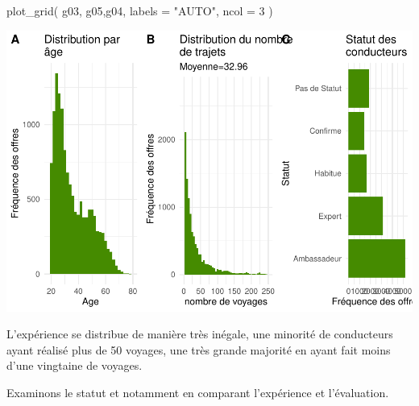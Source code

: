 \documentclass[
]{book}
\newenvironment{Shaded}{\begin{snugshade}}{\end{snugshade}}
\newcommand{\AttributeTok}[1]{\textcolor[rgb]{0.77,0.63,0.00}{#1}}
\newcommand{\DecValTok}[1]{\textcolor[rgb]{0.00,0.00,0.81}{#1}}
\newcommand{\FunctionTok}[1]{\textcolor[rgb]{0.00,0.00,0.00}{#1}}
\newcommand{\NormalTok}[1]{#1}
\newcommand{\StringTok}[1]{\textcolor[rgb]{0.31,0.60,0.02}{#1}}
\begin{document}
\begin{Shaded}
\begin{Highlighting}[]
\FunctionTok{plot\_grid}\NormalTok{(}
\NormalTok{  g03, g05,g04,}
  \AttributeTok{labels =} \StringTok{"AUTO"}\NormalTok{, }\AttributeTok{ncol =} \DecValTok{3}
\NormalTok{)}
\end{Highlighting}
\end{Shaded}

\includegraphics{bookdown-demo_files/figure-latex/0904-1.pdf}

L'expérience se distribue de manière très inégale, une minorité de conducteurs ayant réalisé plus de 50 voyages, une très grande majorité en ayant fait moins d'une vingtaine de voyages.

Examinons le statut et notamment en comparant l'expérience et l'évaluation.
\end{document}

